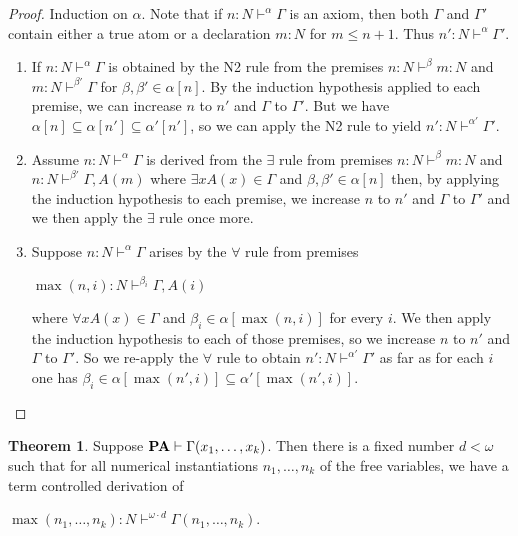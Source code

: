 \documentclass[8pt]{article}
\theoremstyle{definition}
\theoremstyle{definition}
\newtheorem{theorem}{Theorem}[section]
\theoremstyle{definition}
\theoremstyle{definition}
\theoremstyle{definition}
\theoremstyle{definition}
\theoremstyle{definition}
\theoremstyle{definition}
\theoremstyle{definition}
\theoremstyle{definition}
\theoremstyle{definition}
\theoremstyle{definition}
\theoremstyle{definition}
\theoremstyle{question}
\begin{document}
\begin{proof}
  Induction on $\alpha$. Note that if $n : N \vdash^{\alpha} \Gamma$ is an axiom, then both
  $\Gamma$ and $\Gamma'$ contain either a true atom or a declaration $m : N$ for $m \leq n + 1$. 
  Thus $n' : N \vdash^{\alpha} \Gamma'$.
  \begin{enumerate}
    \item If $n : N \vdash^{\alpha} \Gamma$ is obtained by the N2 rule from the premises
    $n : N \vdash^{\beta} m : N$ and $m : N \vdash^{\beta'} \Gamma$ for 
    $\beta, \beta' \in \alpha[n]$. By the induction hypothesis applied to each premise, we can increase $n$
    to $n'$ and $\Gamma$ to $\Gamma'$. But we have $\alpha[n] \subseteq \alpha[n'] \subseteq \alpha'[n']$,
    so we can apply the N2 rule to yield $n' : N \vdash^{\alpha'} \Gamma'$.
    \item Assume $n : N \vdash^{\alpha} \Gamma$ is derived from the $\exists$ rule from premises
    $n : N \vdash^{\beta} m : N$ and $n : N \vdash^{\beta'} \Gamma, A(m)$ where $\exists x A(x) \in \Gamma$
    and $\beta, \beta' \in \alpha[n]$ then, by applying the induction hypothesis to each premise,
    we increase $n$ to $n'$ and $\Gamma$ to $\Gamma'$ and we then apply the $\exists$ rule once more.
    \item Suppose $n : N \vdash^{\alpha} \Gamma$ arises by the $\forall$ rule from premises
    \begin{center}
      $\max(n, i) : N \vdash^{\beta_i} \Gamma, A(i)$
    \end{center}
    where $\forall x A(x) \in \Gamma$ and $\beta_i \in \alpha[\max(n, i)]$ for every $i$.
    We then apply the induction hypothesis to each of those premises, so we increase $n$ to $n'$ and $\Gamma$ to $\Gamma'$.
    So we re-apply the $\forall$ rule to obtain $n' : N \vdash^{\alpha'} \Gamma'$ as far as for each $i$ one has
    $\beta_i \in \alpha[\max(n', i)] \subseteq \alpha'[\max(n', i)]$.
  \end{enumerate}
\end{proof}

\begin{theorem}
  Suppose ${\bf PA} \vdash \Gamma(x_1, \ldots, x_k)$. Then there is a fixed number $d < \omega$
  such that for all numerical instantiations $n_1, \ldots, n_k$ of the free variables, we have a term controlled
  derivation of
  \begin{center}
    $\max(n_1, \ldots, n_k) : N \vdash^{\omega \cdot d} \Gamma(n_1, \ldots, n_k)$.
  \end{center}
\end{theorem}
\end{document}
